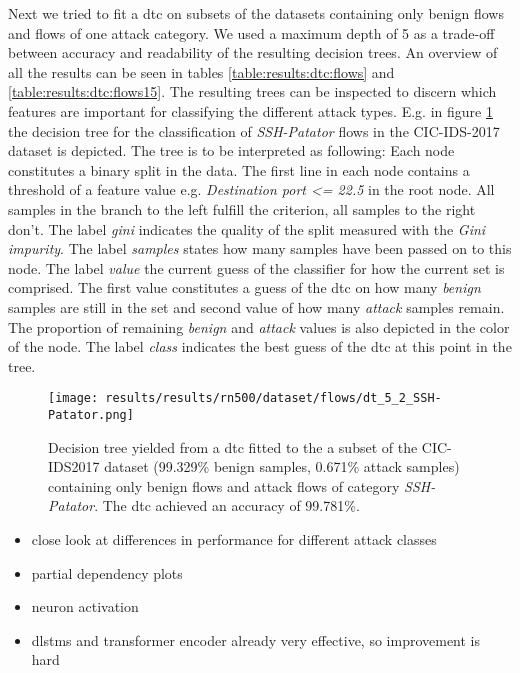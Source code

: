 Next we tried to fit a \gls{dtc} on subsets of the datasets containing only benign flows and flows of one attack category. We used a maximum depth of 5 as a trade-off between accuracy and readability of the resulting decision trees. An overview of all the results can be seen in tables \ref{table:results:dtc:flows} and \ref{table:results:dtc:flows15}. The resulting trees can be inspected to discern which features are important for classifying the different attack types. E.g. in figure \ref{fig:results:dtc:cic2017:ssh_patator} the decision tree for the classification of \textit{SSH-Patator} flows in the CIC-IDS-2017 dataset is depicted. The tree is to be interpreted as following: Each node constitutes a binary split in the data. The first line in each node contains a threshold of a feature value e.g. \textit{Destination port <= 22.5} in the root node. All samples in the branch to the left fulfill the criterion, all samples to the right don't. The label \textit{gini} indicates the quality of the split measured with the \textit{Gini impurity}. The label \textit{samples} states how many samples have been passed on to this node. The label \textit{value} the current guess of the classifier for how the current set is comprised. The first value constitutes a guess of the \gls{dtc} on how many \textit{benign} samples are still in the set and second value of how many \textit{attack} samples remain. The proportion of remaining \textit{benign} and \textit{attack} values is also depicted in the color of the node. The label \textit{class} indicates the best guess of the \gls{dtc} at this point in the tree.  

\begin{figure}[!htbp]
	\centering
	\texttt{[image: results/results/rn500/dataset/flows/dt\_5\_2\_SSH-Patator.png]}
	\caption{Decision tree yielded from a \gls{dtc} fitted to the a subset of the CIC-IDS2017 dataset (99.329\% benign samples, 0.671\% attack samples) containing only benign flows and attack flows of category \textit{SSH-Patator}. The \gls{dtc} achieved an accuracy of 99.781\%.}
	\label{fig:results:dtc:cic2017:ssh_patator}
\end{figure}





\begin{itemize}
	\item close look at differences in performance for different attack classes
	\item partial dependency plots
	\item neuron activation
	\item \gls{dlstm}s and transformer encoder already very effective, so improvement is hard
\end{itemize}

\newpage
